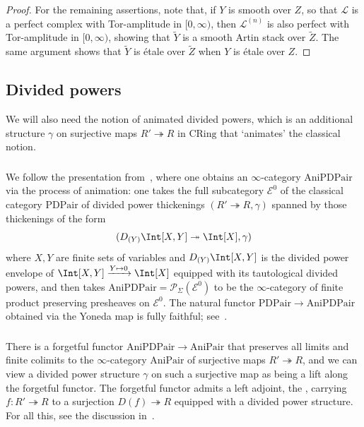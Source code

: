 \documentclass[10pt]{amsart}
\begin{document}
\begin{proof}
For the remaining assertions, note that, if $Y$ is smooth over $Z$, so that $\mathcal{L}$ is a perfect complex with Tor-amplitude in $[0,\infty)$, then $\mathcal{L}^{(n)}$ is also perfect with Tor-amplitude in $[0,\infty)$, showing that $\tilde{Y}$ is a smooth Artin stack over $\tilde{Z}$. The same argument shows that $\tilde{Y}$ is \'etale over $\tilde{Z}$ when $Y$ is \'etale over $Z$.
\end{proof}








\subsection{Divided powers}
\label{subsec:divided_powers}

We will also need the notion of animated divided powers, which is an additional structure $\gamma$ on surjective maps $R'\twoheadrightarrow R$ in $\mathrm{CRing}$ that `animates' the classical notion. 

\subsubsection{}
We follow the presentation from~\cite[\S 3.2]{Mao2021-jt}, where one obtains an $\infty$-category $\mathrm{AniPDPair}$ via the process of animation: one takes the full subcategory $\mathcal{E}^{0}$ of the classical category $\mathrm{PDPair}$ of divided power thickenings $(R'\twoheadrightarrow R,\gamma)$ spanned by those thickenings of the form
\[
(D_{(Y)}\Int[X,Y]\twoheadrightarrow \Int[X],\gamma)
\]
where $X,Y$ are finite sets of variables and $D_{(Y)}\Int[X,Y]$ is the divided power envelope of $\Int[X,Y]\xrightarrow{Y\mapsto 0}\Int[X]$ equipped with its tautological divided powers, and then takes $\mathrm{AniPDPair} = \mathcal{P}_{\Sigma}(\mathcal{E}^0)$ to be the $\infty$-category of finite product preserving presheaves on $\mathcal{E}^0$. The natural functor $\mathrm{PDPair}\to \mathrm{AniPDPair}$ obtained via the Yoneda map is fully faithful; see~\cite[Lemma 3.13]{Mao2021-jt}.

\subsubsection{}
There is a forgetful functor $\mathrm{AniPDPair}\to \mathrm{AniPair}$ that preserves all limits and finite colimits to the $\infty$-category $\mathrm{AniPair}$ of surjective maps $R'\twoheadrightarrow R$, and we can view a divided power structure $\gamma$ on such a surjective map as being a lift along the forgetful functor. The forgetful functor admits a left adjoint, the , carrying $f:R'\twoheadrightarrow R$ to a surjection $D(f)\twoheadrightarrow R$ equipped with a divided power structure. For all this, see the discussion in~\cite[\S 3.2]{Mao2021-jt}.
\end{document}
